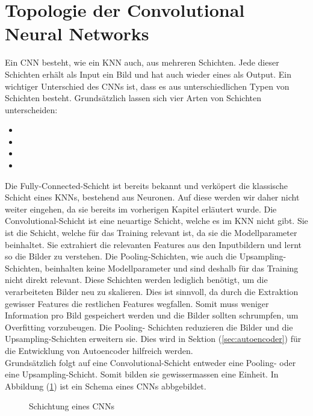 \section{Topologie der Convolutional Neural Networks}
Ein CNN besteht, wie ein KNN auch, aus mehreren Schichten. Jede dieser Schichten erhält
als Input ein Bild und hat auch wieder eines als Output.
Ein wichtiger Unterschied des CNNs ist, dass es aus unterschiedlichen Typen von
Schichten besteht. Grundsätzlich lassen sich vier Arten von Schichten unterscheiden:
\begin{itemize}
\item{}
\item{}
\item{}
\item{}
\end{itemize}
Die Fully-Connected-Schicht ist bereits bekannt und verköpert die klassische Schicht
eines KNNs, bestehend aus Neuronen. Auf diese werden wir daher nicht weiter eingehen,
da sie bereits im vorherigen Kapitel erläutert wurde.
\para{}
Die Convolutional-Schicht ist eine neuartige Schicht, welche es im KNN nicht
gibt. Sie ist die Schicht, welche für das Training relevant ist,
da sie die Modellparameter beinhaltet. Sie extrahiert die relevanten Features
aus den Inputbildern und lernt so die Bilder zu verstehen.
\para{}
Die Pooling-Schichten, wie auch die Upsampling-Schichten, beinhalten keine
Modellparameter und sind deshalb für das Training nicht direkt relevant.
Diese Schichten werden lediglich benötigt, um die verarbeiteten Bilder neu zu
skalieren. Dies ist sinnvoll, da durch die Extraktion gewisser Features die
restlichen Features wegfallen. Somit muss weniger Information pro Bild gespeichert
werden und die Bilder sollten schrumpfen, um Overfitting vorzubeugen. Die Pooling-
Schichten reduzieren die Bilder und die Upsampling-Schichten erweitern sie.
Dies wird in Sektion (\ref{sec:autoencoder}) für die Entwicklung von Autoencoder
hilfreich werden. \\
Grundsätzlich folgt auf eine Convolutional-Schicht entweder eine Pooling-
oder eine Upsampling-Schicht. Somit bilden sie gewissermassen eine Einheit.
\para{}
In Abbildung (\ref{fig:cnn_topology}) ist ein Schema eines CNNs abbgebildet.
\begin{figure}[h!]

  \caption{Schichtung eines CNNs}
  \label{fig:cnn_topology}
\end{figure}

